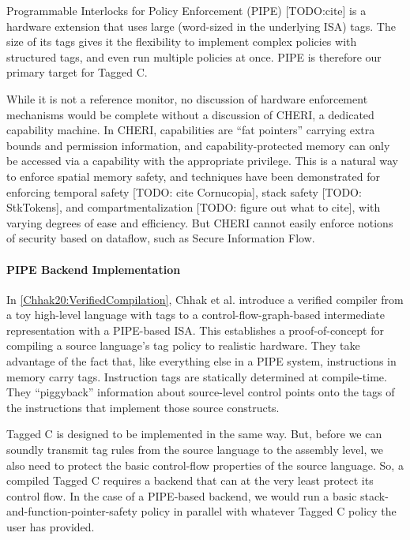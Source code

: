 \documentclass[acmsmall,review,anonymous]{acmart}\settopmatter{printfolios=true,printccs=false,printacmref=false}
\begin{document}
Programmable Interlocks for Policy Enforcement (PIPE) [TODO:cite] is a hardware extension
that uses large (word-sized in the underlying ISA) tags. The size of its tags gives it the flexibility
to implement complex policies with structured tags, and even run multiple policies at once.
PIPE is therefore our primary target for Tagged C.

While it is not a reference monitor, no discussion of hardware enforcement mechanisms would
be complete without a discussion of CHERI, a dedicated capability machine. In CHERI, capabilities
are ``fat pointers'' carrying extra bounds and permission information, and capability-protected
memory can only be accessed via a capability with the appropriate privilege. This is a natural
way to enforce spatial memory safety, and techniques have been demonstrated for enforcing
temporal safety [TODO: cite Cornucopia], stack safety [TODO: StkTokens], and compartmentalization
[TODO: figure out what to cite], with varying degrees of ease and efficiency. But CHERI
cannot easily enforce notions of security based on dataflow, such as Secure Information Flow.

\paragraph{PIPE Backend Implementation}

In \cref{Chhak20:VerifiedCompilation}, Chhak et al. introduce a verified compiler from a toy
high-level language with tags
to a control-flow-graph-based intermediate representation with a PIPE-based
ISA. This establishes a proof-of-concept for compiling a source language's tag policy to
realistic hardware. They take advantage of the fact that, like everything else in a PIPE system,
instructions in memory carry tags. Instruction tags are statically determined at compile-time.
They ``piggyback'' information about source-level control points onto the tags of the instructions
that implement those source constructs.

Tagged C is designed to be implemented in the same way. But, before we can soundly transmit
tag rules from the source language to the assembly level, we also need to protect the basic
control-flow properties of the source language. So, a compiled Tagged C requires a backend that
can at the very least protect its control flow. In the case of a PIPE-based backend, we would
run a basic stack-and-function-pointer-safety policy in parallel with whatever Tagged C policy
the user has provided.
\end{document}

